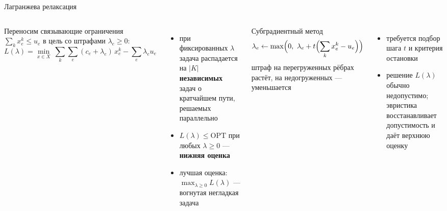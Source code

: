\documentclass[aspectratio=169,10pt]{beamer}
\begin{document}
\begin{frame}{Лагранжева релаксация}
\begin{columns}[T]
Переносим связывающие ограничения $\sum_k x^k_e\le u_e$ в цель со штрафами $\lambda_e\ge0$:
\[
L(\lambda)=\min_{x\in X}\ \sum_{k}\sum_{e}(c_e+\lambda_e)\,x^k_e-\sum_e\lambda_e u_e
\]
\begin{itemize}
\item при фиксированных $\lambda$ задача распадается на $|K|$ \textbf{независимых} задач о кратчайшем пути, решаемых параллельно
\item $L(\lambda)\le\text{OPT}$ при любых $\lambda\ge0$ --- \textbf{нижняя оценка}
\item лучшая оценка: $\max_{\lambda\ge0}L(\lambda)$ --- вогнутая негладкая задача
\end{itemize}
\begin{block}{Субградиентный метод}
\[
\lambda_e\leftarrow\max\Bigl(0,\ \lambda_e+t\Bigl(\sum_k x^k_e-u_e\Bigr)\Bigr)
\]
штраф на перегруженных рёбрах растёт, на недогруженных --- уменьшается
\end{block}
\begin{itemize}
\item требуется подбор шага $t$ и критерия остановки
\item решение $L(\lambda)$ обычно недопустимо; эвристика восстанавливает допустимость и даёт верхнюю оценку
\end{itemize}
\end{columns}
\end{frame}
\end{document}
